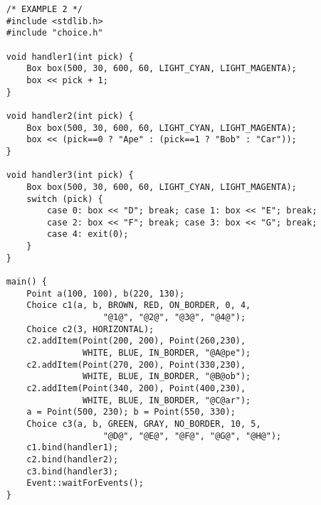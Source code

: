 \begin{verbatim}
    /* EXAMPLE 2 */
    #include <stdlib.h>
    #include "choice.h"

    void handler1(int pick) {
        Box box(500, 30, 600, 60, LIGHT_CYAN, LIGHT_MAGENTA);
        box << pick + 1;
    }

    void handler2(int pick) {
        Box box(500, 30, 600, 60, LIGHT_CYAN, LIGHT_MAGENTA);
        box << (pick==0 ? "Ape" : (pick==1 ? "Bob" : "Car"));
    }

    void handler3(int pick) {
        Box box(500, 30, 600, 60, LIGHT_CYAN, LIGHT_MAGENTA);
        switch (pick) {
            case 0: box << "D"; break; case 1: box << "E"; break;
            case 2: box << "F"; break; case 3: box << "G"; break;
            case 4: exit(0);
        }
    }

    main() {
        Point a(100, 100), b(220, 130);
        Choice c1(a, b, BROWN, RED, ON_BORDER, 0, 4,
                       "@1@", "@2@", "@3@", "@4@");
        Choice c2(3, HORIZONTAL);
        c2.addItem(Point(200, 200), Point(260,230),
                   WHITE, BLUE, IN_BORDER, "@A@pe");
        c2.addItem(Point(270, 200), Point(330,230),
                   WHITE, BLUE, IN_BORDER, "@B@ob");
        c2.addItem(Point(340, 200), Point(400,230),
                   WHITE, BLUE, IN_BORDER, "@C@ar");
        a = Point(500, 230); b = Point(550, 330);
        Choice c3(a, b, GREEN, GRAY, NO_BORDER, 10, 5,
                       "@D@", "@E@", "@F@", "@G@", "@H@");
        c1.bind(handler1);
        c2.bind(handler2);
        c3.bind(handler3);
        Event::waitForEvents();
    }
\end{verbatim}


